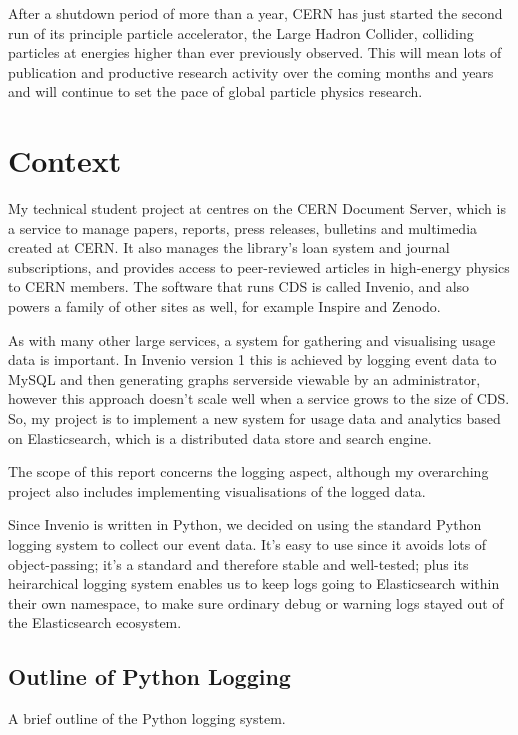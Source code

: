 \documentclass[a4paper,11pt]{article} %
\begin{document}

After a shutdown period of more than a year, CERN has just started the second
run of its principle particle accelerator, the Large Hadron Collider, colliding
particles at energies higher than ever previously observed.  This will mean
lots of publication and productive research activity over the coming months and
years and will continue to set the pace of global particle physics research.

\section{Context}
\label{sec:context}
My technical student project at centres on the CERN Document Server, which is a
service to manage papers, reports, press releases, bulletins and multimedia
created at CERN.  It also manages the library's loan system and journal
subscriptions, and provides access to peer-reviewed articles in high-energy
physics to CERN members.  The software that runs CDS is called Invenio, and
also powers a family of other sites as well, for example Inspire and Zenodo.

As with many other large services, a system for gathering and visualising usage
data is important.  In Invenio version 1 this is achieved by logging event data
to MySQL and then generating graphs serverside viewable by an administrator,
however this approach doesn't scale well when a service grows to the size of
CDS.  So, my project is to implement a new system for usage data and analytics
based on Elasticsearch, which is a distributed data store and search engine.

The scope of this report concerns the logging aspect, although my overarching
project also includes implementing visualisations of the logged data.

Since Invenio is written in Python, we decided on using the standard Python
logging system to collect our event data.  It's easy to use since it avoids
lots of object-passing; it's a standard and therefore stable and well-tested;
plus its heirarchical logging system enables us to keep logs going to
Elasticsearch within their own namespace, to make sure ordinary debug or
warning logs stayed out of the Elasticsearch ecosystem.

\subsection{Outline of Python Logging}
\label{sec:pythonlogging}
A brief outline of the Python logging system.
\end{document}
